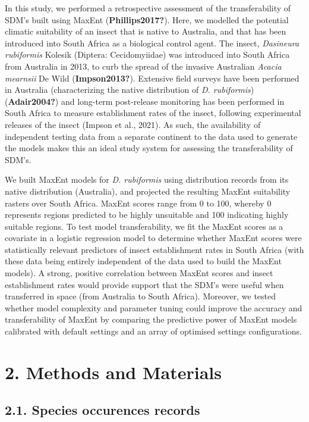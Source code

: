 \documentclass[12pt,]{article}
\begin{document}
In this study, we performed a retrospective assessment of the
transferability of SDM's built using MaxEnt (\textbf{Phillips2017?}).
Here, we modelled the potential climatic suitability of an insect that
is native to Australia, and that has been introduced into South Africa
as a biological control agent. The insect, \emph{Dasineura rubiformis}
Kolesik (Diptera: Cecidomyiidae) was introduced into South Africa from
Australia in 2013, to curb the spread of the invasive Australian
\emph{Acacia mearnsii} De Wild (\textbf{Impson2013?}). Extensive field
surveys have been performed in Australia (characterizing the native
distribution of \emph{D. rubiformis}) (\textbf{Adair2004?}) and
long-term post-release monitoring has been performed in South Africa to
measure establishment rates of the insect, following experimental
releases of the insect (Impson et al., 2021). As such, the availability
of independent testing data from a separate continent to the data used
to generate the models makes this an ideal study system for assessing
the transferability of SDM's.

We built MaxEnt models for \emph{D. rubiformis} using distribution
records from its native distribution (Australia), and projected the
resulting MaxEnt suitability rasters over South Africa. MaxEnt scores
range from 0 to 100, whereby 0 represents regions predicted to be highly
unsuitable and 100 indicating highly suitable regions. To test model
transferability, we fit the MaxEnt scores as a covariate in a logistic
regression model to determine whether MaxEnt scores were statistically
relevant predictors of insect establishment rates in South Africa (with
these data being entirely independent of the data used to build the
MaxEnt models). A strong, positive correlation between MaxEnt scores and
insect establishment rates would provide support that the SDM's were
useful when transferred in space (from Australia to South Africa).
Moreover, we tested whether model complexity and parameter tuning could
improve the accuracy and transferability of MaxEnt by comparing the
predictive power of MaxEnt models calibrated with default settings and
an array of optimised settings configurations.

\hypertarget{methods-and-materials}{%
\section{2. Methods and Materials}\label{methods-and-materials}}

\hypertarget{species-occurences-records}{%
\subsection{2.1. Species occurences
records}\label{species-occurences-records}}
\end{document}
